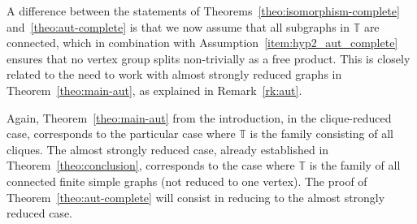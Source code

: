 \documentclass[a4paper,english,11pt]{article}
\theoremstyle{definition}
\theoremstyle{remark}
\begin{document}
A difference between the statements of Theorems~\ref{theo:isomorphism-complete} and~\ref{theo:aut-complete} is that we now assume that all subgraphs in $\mathbb{T}$ are connected, which in  combination with Assumption~\ref{item:hyp2_aut_complete} ensures that no vertex group splits non-trivially as a free product. This is closely related to the need to work with almost strongly reduced graphs in Theorem~\ref{theo:main-aut}, as explained in Remark~\ref{rk:aut}.

Again, Theorem~\ref{theo:main-aut} from the introduction, in the clique-reduced case, corresponds to the particular case where $\mathbb{T}$ is the family consisting of all cliques. The almost strongly reduced case, already established in Theorem~\ref{theo:conclusion}, corresponds to the case where $\mathbb{T}$ is the family of all connected finite simple graphs (not reduced to one vertex). The proof of Theorem~\ref{theo:aut-complete} will consist in reducing to the almost strongly reduced case.
\end{document}
